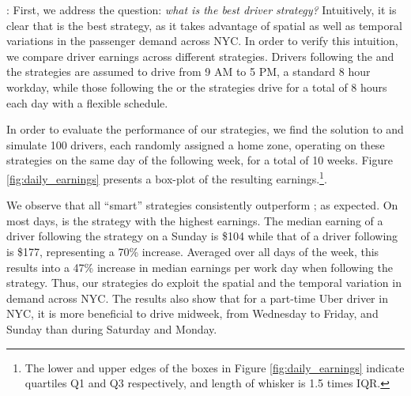 : First, we address the question: \textit{what is the best driver strategy?} Intuitively, it is clear that {\relocationflexible} is the best strategy, as it takes advantage of spatial as well as temporal variations in the passenger demand across NYC. In order to verify this intuition, we compare driver earnings across different strategies. Drivers following the {\naive} and the {\relocation} strategies are assumed to drive from 9 AM to 5 PM, a standard 8 hour workday, while those following the {\flexible} or the {\relocationflexible} strategies drive for a total of 8 hours each day with a flexible schedule.

In order to evaluate the performance of our strategies, we find the solution to {\originalproblem} and simulate 100 drivers, each randomly assigned a 
home zone, operating on these strategies on the same day of the following week, for a total of 10 weeks. Figure \ref{fig:daily_earnings} presents a box-plot of the resulting earnings.\footnote{The lower and upper edges of the boxes in Figure \ref{fig:daily_earnings} indicate quartiles Q1 and Q3 respectively, and length of whisker is 1.5 times IQR.}.

We observe that all ``smart'' strategies consistently outperform {\naive};
as expected. On most days, {\relocationflexible} is the strategy with the highest earnings.
The median earning of a driver following the {\naive} strategy on a Sunday is \$104 while that of a driver following {\relocationflexible} is \$177, representing a 70\% increase. Averaged over all days of the week, this results into a 47\% increase in median earnings per work day when following the {\relocationflexible} strategy. 
Thus, our strategies do exploit the spatial and the temporal variation in demand across NYC. The results also show
that for a part-time Uber driver in NYC, it is more beneficial to drive midweek, from Wednesday to Friday, and Sunday
than during Saturday and Monday.


